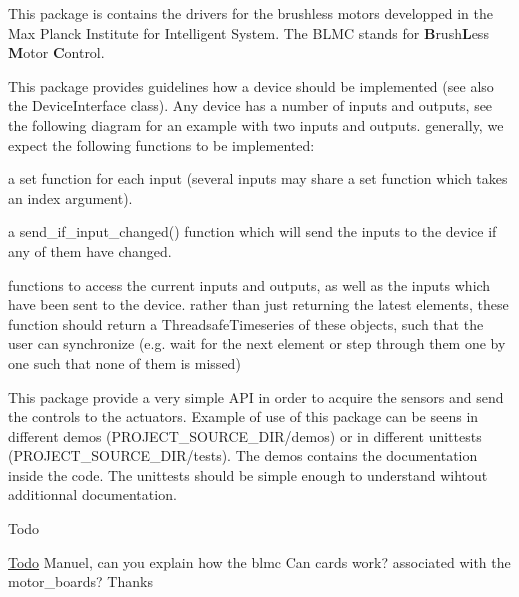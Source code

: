 This package is contains the drivers for the brushless motors developped in the Max Planck Institute for Intelligent System. The B\+L\+MC stands for {\bfseries B}rush{\bfseries L}ess {\bfseries M}otor {\bfseries C}ontrol.

This package provides guidelines how a device should be implemented (see also the Device\+Interface class). Any device has a number of inputs and outputs, see the following diagram for an example with two inputs and outputs.  generally, we expect the following functions to be implemented\+:
\begin{DoxyItemize}
\item a set function for each input (several inputs may share a set function which takes an index argument).
\item a send\+\_\+if\+\_\+input\+\_\+changed() function which will send the inputs to the device if any of them have changed.
\item functions to access the current inputs and outputs, as well as the inputs which have been sent to the device. rather than just returning the latest elements, these function should return a Threadsafe\+Timeseries of these objects, such that the user can synchronize (e.\+g. wait for the next element or step through them one by one such that none of them is missed)
\end{DoxyItemize}

This package provide a very simple A\+PI in order to acquire the sensors and send the controls to the actuators. Example of use of this package can be seens in different demos (P\+R\+O\+J\+E\+C\+T\+\_\+\+S\+O\+U\+R\+C\+E\+\_\+\+D\+I\+R/demos) or in different unittests (P\+R\+O\+J\+E\+C\+T\+\_\+\+S\+O\+U\+R\+C\+E\+\_\+\+D\+I\+R/tests). The demos contains the documentation inside the code. The unittests should be simple enough to understand wihtout additionnal documentation.

\begin{DoxyRefDesc}{Todo}
\item[\hyperlink{todo__todo000001}{Todo}]Manuel, can you explain how the blmc Can cards work? associated with the motor\+\_\+boards? Thanks\end{DoxyRefDesc}
